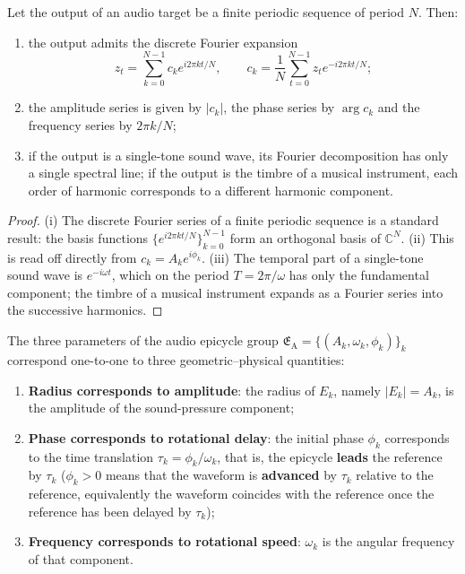 \begin{theorem}\label{thm:audio_series_reconstruction}
Let the output of an audio target be a finite periodic sequence of period $N$. Then:
\begin{enumerate}[label=(\roman*)]
    \item the output admits the discrete Fourier expansion
    \[
    z_t=\sum_{k=0}^{N-1}c_k e^{i2\pi kt/N},\qquad
    c_k=\frac1N\sum_{t=0}^{N-1}z_t e^{-i2\pi kt/N};
    \]
    \item the amplitude series is given by $|c_k|$, the phase series by $\arg c_k$ and the frequency series by $2\pi k/N$;
    \item if the output is a single-tone sound wave, its Fourier decomposition has only a single spectral line; if the output is the timbre of a musical instrument, each order of harmonic corresponds to a different harmonic component.
\end{enumerate}
\end{theorem}

\begin{proof}
(i) The discrete Fourier series of a finite periodic sequence is a standard result: the basis functions $\{e^{i2\pi kt/N}\}_{k=0}^{N-1}$ form an orthogonal basis of $\mathbb C^N$.
(ii) This is read off directly from $c_k=A_k e^{i\phi_k}$.
(iii) The temporal part of a single-tone sound wave is $e^{-i\omega t}$, which on the period $T=2\pi/\omega$ has only the fundamental component; the timbre of a musical instrument expands as a Fourier series into the successive harmonics.
\end{proof}

\begin{proposition}\label{prop:audio_epicycle_correspondence}
The three parameters of the audio epicycle group $\mathfrak E_{\mathrm{A}}=\{(A_k,\omega_k,\phi_k)\}_{k}$ correspond one-to-one to three geometric--physical quantities:
\begin{enumerate}[label=(\roman*)]
    \item \textbf{Radius corresponds to amplitude}: the radius of $E_k$, namely $|E_k|=A_k$, is the amplitude of the sound-pressure component;
    \item \textbf{Phase corresponds to rotational delay}: the initial phase $\phi_k$ corresponds to the time translation $\tau_k=\phi_k/\omega_k$, that is, the epicycle \textbf{leads} the reference by $\tau_k$ ($\phi_k>0$ means that the waveform is \textbf{advanced} by $\tau_k$ relative to the reference, equivalently the waveform coincides with the reference once the reference has been delayed by $\tau_k$);
    \item \textbf{Frequency corresponds to rotational speed}: $\omega_k$ is the angular frequency of that component.
\end{enumerate}
\end{proposition}

